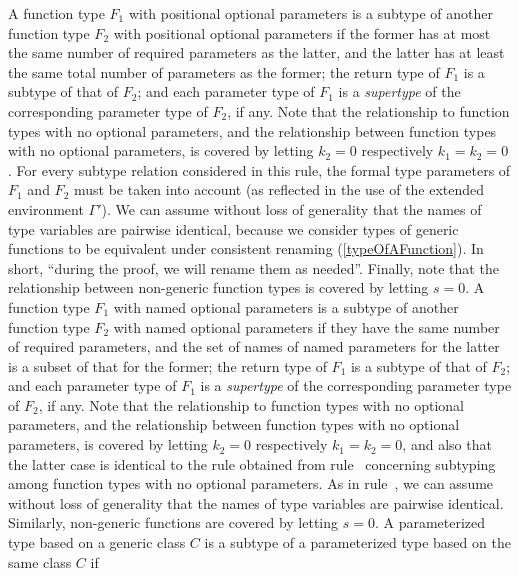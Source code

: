\documentclass[makeidx]{article}
\begin{document}
{{\begin{itemize}
  A function type $F_1$ with positional optional parameters
  is a subtype of
  another function type $F_2$ with positional optional parameters
  if the former has at most the same number of required parameters as the latter,
  and the latter has at least the same total number of parameters as the former;
  the return type of $F_1$ is a subtype of that of $F_2$;
  and each parameter type of $F_1$ is a \emph{supertype} of
  the corresponding parameter type of $F_2$, if any.
  Note that the relationship to function types with no optional parameters,
  and the relationship between function types with no optional parameters,
  is covered by letting $k_2 = 0$ respectively $k_1 = k_2 = 0$.
  For every subtype relation considered in this rule,
  the formal type parameters of $F_1$ and $F_2$ must be taken into account
  (as reflected in the use of the extended environment $\Gamma'$).
  We can assume without loss of generality
  that the names of type variables are pairwise identical,
  because we consider types of generic functions to be equivalent under
  consistent renaming
  (\ref{typeOfAFunction}).
  In short, ``during the proof, we will rename them as needed''.
  Finally, note that the relationship between non-generic function types
  is covered by letting $s = 0$.
  A function type $F_1$ with named optional parameters is a subtype of
  another function type $F_2$ with named optional parameters
  if they have the same number of required parameters,
  and the set of names of named parameters for the latter is a subset
  of that for the former;
  the return type of $F_1$ is a subtype of that of $F_2$;
  and each parameter type of $F_1$ is a \emph{supertype} of
  the corresponding parameter type of $F_2$, if any.
  Note that the relationship to function types with no optional parameters,
  and the relationship between function types with no optional parameters,
  is covered by letting $k_2 = 0$ respectively $k_1 = k_2 = 0$,
  and also that the latter case is identical to the rule obtained from
  rule~\SrnPositionalFunctionType{}
  concerning subtyping among function types with no optional parameters.
  As in rule~\SrnPositionalFunctionType,
  we can assume without loss of generality
  that the names of type variables are pairwise identical.
  Similarly, non-generic functions are covered by letting $s = 0$.
  A parameterized type based on a generic class $C$ is a subtype of
  a parameterized type based on the same class $C$ if

\end{itemize}}}
\end{document}

